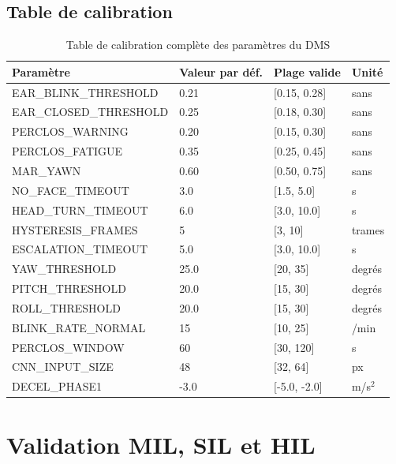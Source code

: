 \documentclass[12pt,a4paper]{report}
\begin{document}
\section{Table de calibration}

\begin{table}[H]
\centering
\caption{Table de calibration compl\`ete des param\`etres du DMS}
\label{tab:calibration}
\begin{tabular}{L{5cm} C{2.5cm} L{3cm} L{2cm}}
\toprule
\textbf{Param\`etre} & \textbf{Valeur par d\'ef.} & \textbf{Plage valide} & \textbf{Unit\'e} \\
\midrule
EAR\_BLINK\_THRESHOLD & 0.21 & [0.15, 0.28] & sans \\
EAR\_CLOSED\_THRESHOLD & 0.25 & [0.18, 0.30] & sans \\
PERCLOS\_WARNING & 0.20 & [0.15, 0.30] & sans \\
PERCLOS\_FATIGUE & 0.35 & [0.25, 0.45] & sans \\
MAR\_YAWN & 0.60 & [0.50, 0.75] & sans \\
NO\_FACE\_TIMEOUT & 3.0 & [1.5, 5.0] & s \\
HEAD\_TURN\_TIMEOUT & 6.0 & [3.0, 10.0] & s \\
HYSTERESIS\_FRAMES & 5 & [3, 10] & trames \\
ESCALATION\_TIMEOUT & 5.0 & [3.0, 10.0] & s \\
YAW\_THRESHOLD & 25.0 & [20, 35] & degr\'es \\
PITCH\_THRESHOLD & 20.0 & [15, 30] & degr\'es \\
ROLL\_THRESHOLD & 20.0 & [15, 30] & degr\'es \\
BLINK\_RATE\_NORMAL & 15 & [10, 25] & /min \\
PERCLOS\_WINDOW & 60 & [30, 120] & s \\
CNN\_INPUT\_SIZE & 48 & [32, 64] & px \\
DECEL\_PHASE1 & -3.0 & [-5.0, -2.0] & m/s$^2$ \\
\bottomrule
\end{tabular}
\end{table}

\clearpage

\chapter{Validation MIL, SIL et HIL}
\end{document}
